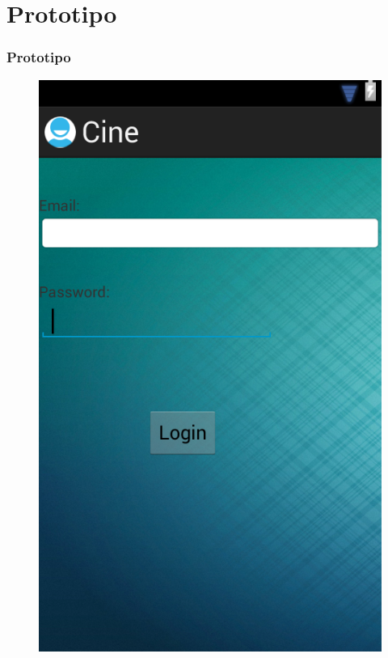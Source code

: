 \documentclass{beamer}
\begin{document}
\section{Prototipo}
\begin{frame}[allowframebreaks]
\frametitle{Prototipo}
\begin{figure}[h]
\centering
\includegraphics[height=1.0\textheight]{main.png}
\end{figure}
\end{frame}
\end{document}
